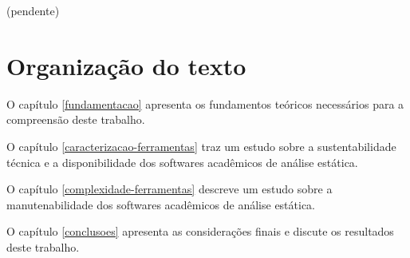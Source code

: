 (pendente)

\section{Organização do texto}

O capítulo \ref{fundamentacao} apresenta os fundamentos teóricos necessários
para a compreensão deste trabalho.

O capítulo \ref{caracterizacao-ferramentas} traz um estudo sobre a
sustentabilidade técnica e a disponibilidade dos softwares acadêmicos de
análise estática.

O capítulo \ref{complexidade-ferramentas} descreve um estudo sobre a
manutenabilidade dos softwares acadêmicos de análise estática.

O capítulo \ref{conclusoes} apresenta as considerações finais e discute os
resultados deste trabalho.
